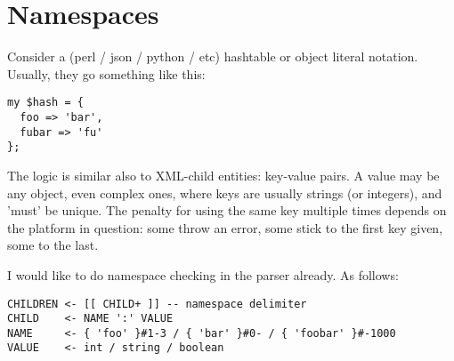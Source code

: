 \section{Namespaces}

Consider a (perl / json / python / etc) hashtable or object literal
notation. Usually, they go something like this:

\begin{myquote}
\begin{verbatim}
my $hash = {
  foo => 'bar',
  fubar => 'fu'
};

\end{verbatim}
\end{myquote}

The logic is similar also to XML-child entities: key-value pairs.
A value may be any object, even complex ones, where keys are
usually strings (or integers), and 'must' be unique. The penalty
for using the same key multiple times depends on the platform in
question: some throw an error, some stick to the first key given,
some to the last.

I would like to do namespace checking in the parser already.
As follows:

\begin{myquote}
\begin{verbatim}
CHILDREN <- [[ CHILD+ ]] -- namespace delimiter
CHILD    <- NAME ':' VALUE
NAME     <- { 'foo' }#1-3 / { 'bar' }#0- / { 'foobar' }#-1000
VALUE    <- int / string / boolean

\end{verbatim}
\end{myquote}


